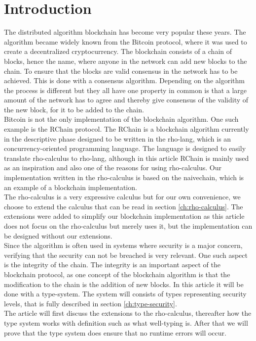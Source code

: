 \section{Introduction}
The distributed algorithm blockchain has become very popular these years. The algorithm became widely known from the Bitcoin protocol, where it was used to create a decentralized cryptocurrency\citep{website:blockchain}. The blockchain consists of a chain of blocks, hence the name, where anyone in the network can add new blocks to the chain. To ensure that the blocks are valid consensus in the network has to be achieved. This is done with a consensus algorithm. Depending on the algorithm the process is different but they all have one property in common is that a large amount of the network has to agree and thereby give consensus of the validity of the new block, for it to be added to the chain.\\
Bitcoin is not the only implementation of the blockchain algorithm. One such example is the RChain protocol\citep{website:RChain}. The RChain is a blockchain algorithm currently in the descriptive phase designed to be written in the rho-lang, which is an concurrency-oriented programming language. The language is designed to easily translate rho-calculus to rho-lang\citep{website:rho-lang}, although in this article RChain is mainly used as an inspiration and also one of the reasons for using rho-calculus. Our implementation written in the rho-calculus is based on the naivechain, which is an example of a blockchain implementation\citep{naivechain}.\\

The rho-calculus is a very expressive calculus but for our own convenience, we choose to extend the calculus that can be read in section \ref{ch:rho-calculus}. The extensions were added to simplify our blockchain implementation as this article does not focus on the rho-calculus but merely uses it, but the implementation can be designed without our extensions.\\

Since the algorithm is often used in systems where security is a major concern, verifying that the security can not be breached is very relevant. One such aspect is the integrity of the chain.
The integrity is an important aspect of the blockchain protocol, as one concept of the blockchain algorithm is that the modification to the chain is the addition of new blocks. In this article it will be done with a type-system. The system will consists of types representing security levels, that is fully described in section \ref{ch:type-security}.\\

The article will first discuss the extensions to the rho-calculus, thereafter how the type system works with definition such as what well-typing is. After that we will prove that the type system does ensure that no runtime errors will occur.
